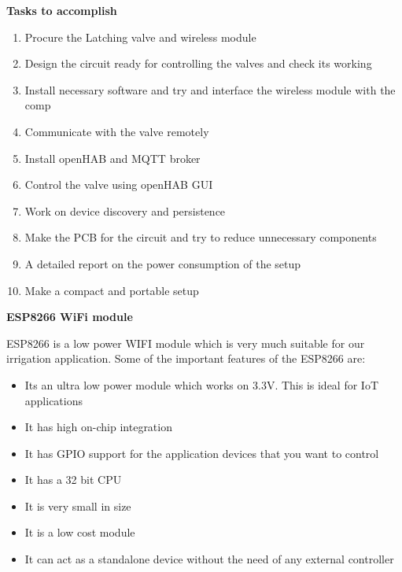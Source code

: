 \documentclass[16pt]{article}
\begin{document}
\hfill

{\Large{\textbf{Tasks to accomplish}}}

\begin{enumerate}

\item
  Procure the Latching valve and wireless module
\item
  Design the circuit ready for controlling the valves and check its
  working
\item
  Install necessary software and try and interface the wireless module
  with the comp
\item
  Communicate with the valve remotely
\item
  Install openHAB and MQTT broker
\item
  Control the valve using openHAB GUI
\item
  Work on device discovery and persistence
\item
  Make the PCB for the circuit and try to reduce unnecessary components
\item
  A detailed report on the power consumption of the setup
\item
  Make a compact and portable setup
\end{enumerate}


\vspace{5cm}
{\LARGE{\textbf{ESP8266 WiFi module}}}

\vspace{0.5cm}

ESP8266 is a low power WIFI module which is very much suitable for our
irrigation application. Some of the important features of the ESP8266
are:

\begin{itemize}

\item
  Its an ultra low power module which works on 3.3V. This is ideal for
  IoT applications
\item
  It has high on-chip integration
\item
  It has GPIO support for the application devices that you want to
  control
\item
  It has a 32 bit CPU
\item
  It is very small in size
\item
  It is a low cost module
\item
  It can act as a standalone device without the need of any external
  controller
\end{itemize}
\end{document}
